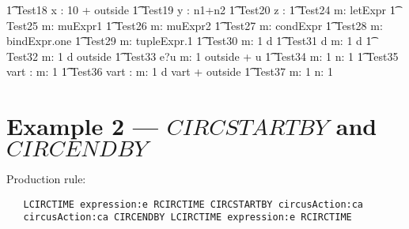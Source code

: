 \documentclass{article}
\begin{document}
%
\begin{circusaction}
   \t1 Test18 \circdef \circwait x : 10 + outside \circspot \Skip
   \also
   \t1 Test19 \circdef \circwait y : n1+n2 \circspot \Skip 
   \also
   \t1 Test20 \circdef \circwait z : \nat \circspot \Skip
   \also
   \t1 Test24 \circdef \circwait m: letExpr \circspot \Skip
   \also
   \t1 Test25 \circdef \circwait m: muExpr1 \circspot \Skip
   \also
   \t1 Test26 \circdef \circwait m: muExpr2 \circspot \Skip
   \also
   \t1 Test27 \circdef \circwait m: condExpr \circspot \Skip
   \also
   \t1 Test28 \circdef \circwait m: bindExpr.one \circspot \Skip
   \also
   \t1 Test29 \circdef \circwait m: tupleExpr.1 \circspot \Skip
   \also
   \t1 Test30 \circdef \circwait m: 1  \circspot d \then \Skip
   \also
   \t1 Test31 \circdef d \then \circwait m: 1  \circspot d \then \Skip
   \also
   \t1 Test32 \circdef \circwait m: 1  \circspot d \then \circwait outside 
   \also
   \t1 Test33 \circdef e?u \then \circwait m: 1  \circspot \circwait outside + u 
   \also
   \t1 Test34 \circdef \circwait m: 1  \circspot \Skip \circseq \circwait n: 1  
   \circspot \Skip
   \also
   \t1 Test35 \circdef \circvres vart : \nat \circspot \circwait m: 1  \circspot \Skip 
   \also
   \t1 Test36 \circdef \circvres vart : \nat \circspot \circwait m: 1  \circspot d \then 
   \circwait vart + outside
   \also
   \t1 Test37 \circdef \circwait m: 1  \circspot \circwait n: 1  \circspot \Skip
\end{circusaction}

        
\section{Example 2 --- $CIRCSTARTBY$ and $CIRCENDBY$}

Production rule:
\begin{verbatim}
   LCIRCTIME expression:e RCIRCTIME CIRCSTARTBY circusAction:ca
   circusAction:ca CIRCENDBY LCIRCTIME expression:e RCIRCTIME
\end{verbatim}
\end{document}
